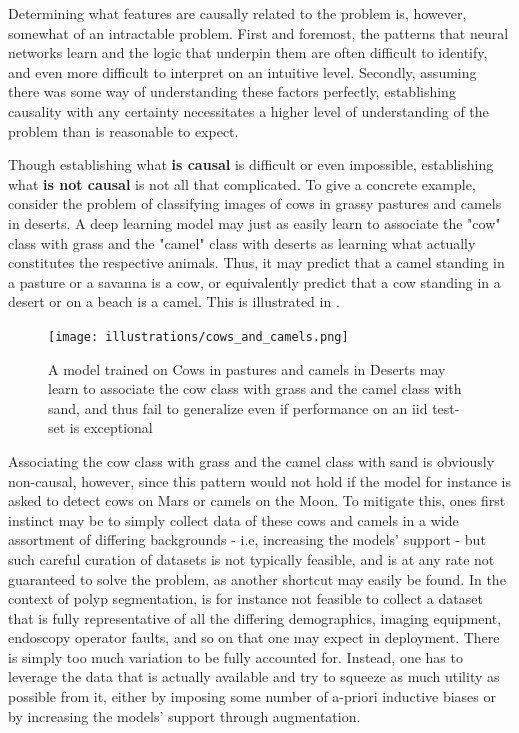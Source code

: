 Determining what features are causally related to the problem is, however, somewhat of an intractable problem. First and foremost, the patterns that neural networks learn and the logic that underpin them are often difficult to identify, and even more difficult to interpret on an intuitive level. Secondly, assuming there was some way of understanding these factors perfectly, establishing causality with any certainty necessitates a higher level of understanding of the problem than is reasonable to expect. 

Though establishing what \textbf{is causal} is difficult or even impossible, establishing what \textbf{is not causal} is not all that complicated. To give a concrete example, consider the problem of classifying images of cows in grassy pastures and camels in deserts. A deep learning model may just as easily learn to associate the "cow" class with grass and the "camel" class with deserts as learning what actually constitutes the respective animals. Thus, it may predict that a camel standing in a pasture or a savanna is a cow, or equivalently predict that a cow standing in a desert or on a beach is a camel. This is illustrated in .

\begin{figure}[h!]
    \centering
    \texttt{[image: illustrations/cows\_and\_camels.png]}
    \caption[Cows and Camels Example]{A model trained on Cows in pastures and camels in Deserts may learn to associate the cow class with grass and the camel class with sand, and thus fail to generalize even if performance on an \gls{iid} test-set is exceptional}
    \label{fig:cows_and_camels}
\end{figure}

Associating the cow class with grass and the camel class with sand is obviously non-causal, however, since this pattern would not hold if the model for instance is asked to detect cows on Mars or camels on the Moon. To mitigate this, ones first instinct may be to simply collect data of these cows and camels in a wide assortment of differing backgrounds - i.e, increasing the models' support - but such careful curation of datasets is not typically feasible, and is at any rate not guaranteed to solve the problem, as another shortcut may easily be found. In the context of polyp segmentation, is for instance not feasible to collect a dataset that is fully representative of all the differing demographics, imaging equipment, endoscopy operator faults, and so on that one may expect in deployment. There is simply too much variation to be fully accounted for. Instead, one has to leverage the data that is actually available and try to squeeze as much utility as possible from it, either by imposing some number of a-priori inductive biases or by increasing the models' support through augmentation.

